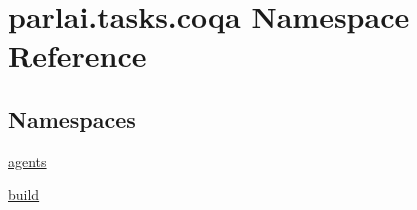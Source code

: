 \hypertarget{namespaceparlai_1_1tasks_1_1coqa}{}\section{parlai.\+tasks.\+coqa Namespace Reference}
\label{namespaceparlai_1_1tasks_1_1coqa}
\subsection*{Namespaces}
\begin{DoxyCompactItemize}
\item 
 \hyperlink{namespaceparlai_1_1tasks_1_1coqa_1_1agents}{agents}
\item 
 \hyperlink{namespaceparlai_1_1tasks_1_1coqa_1_1build}{build}
\end{DoxyCompactItemize}
